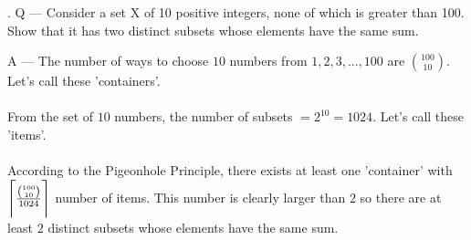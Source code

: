 \documentclass{article}
\DeclarePairedDelimiter{\ceil}{\lceil}{\rceil}
\newcounter{question}
\begin{document}
\newcommand\Que[1]{%
   \leavevmode\par
   \stepcounter{question}
   \noindent
   \thequestion. Q --- #1\par}

\newcommand\Ans[2][]{%
    \leavevmode\par\noindent
   {\leftskip37pt
    A --- \textbf{#1}#2\par}}

\Que{
    Consider a set X of 10 positive integers, none of which is greater than 100. Show that it has two distinct subsets whose elements have the same sum.
    }
\Ans{
    The number of ways to choose $10$ numbers from ${1, 2, 3, ..., 100}$ are $ 100 \choose{10} $. Let's call these 'containers'.\\\\

    From the set of $10$ numbers, the number of subsets $= 2^{10} = 1024 $. Let's call these 'items'.\\\\

    According to the Pigeonhole Principle, there exists at least one 'container' with $\ceil[\Bigg]{\frac{{100 \choose {10}}}{1024}} $ number of items. 
    This number is clearly larger than $ 2 $ so there are at least $ 2 $ distinct subsets whose elements have the same sum.
    }
\end{document}
